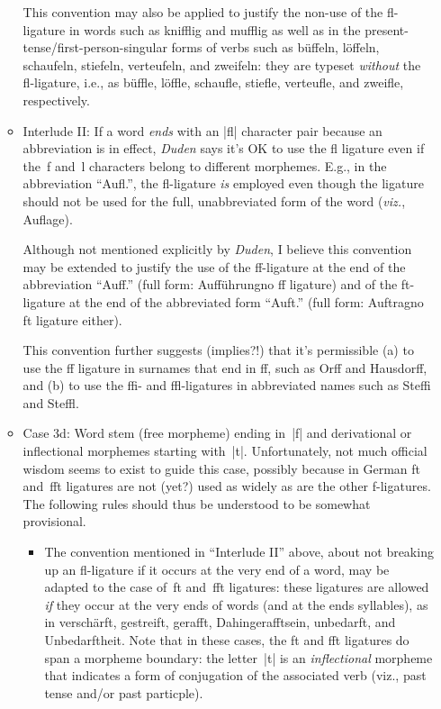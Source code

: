 \documentclass[11pt]{article}
\begin{document}
\begin{itemize}
\begin{itemize}
This convention may also be applied to justify the non-use of the fl-ligature in words such as knifflig and mufflig as well as in the present-tense/first-person-singular forms of verbs such as büffeln, löffeln, schaufeln, stiefeln, verteufeln, and zweifeln: they are typeset \emph{without} the fl-ligature, i.e., as büffle, löffle, schaufle, stiefle, verteufle, and zweifle, respectively.

\item Interlude II: If a word \emph{ends} with an |fl| character pair because an abbreviation is in effect, \emph{Duden} says it's OK to use the fl ligature even if the~f and~l characters belong to different morphemes. E.g., in the abbreviation \enquote{Aufl.}, the fl-ligature \emph{is} employed even though the ligature should not be used for the full, unabbreviated form of the word (\emph{viz.}, Auflage).

Although not mentioned explicitly by \emph{Duden}, I believe this convention may be extended to justify the use of the ff-ligature at the end of the abbreviation \enquote{Auff.} (full form: Aufführung\textemdash no ff ligature) and of the ft-ligature at the end of the abbreviated form \enquote{Auft.} (full form: Auftrag\textemdash no ft ligature either).

This convention further suggests (implies?!) that it's permissible (a) to use the ff ligature in surnames that end in ff, such as Orff and Hausdorff, and (b) to use the ffi- and ffl-ligatures in abbreviated names such as Steffi and Steffl. 

\item Case 3d: Word stem (free morpheme) ending in~|f| and derivational or inflectional morphemes starting with~|t|. Unfortunately, not much official wisdom seems to exist to guide this case, possibly because in German ft and~fft ligatures are not (yet?) used as widely as are the other f-ligatures. The following rules should thus be understood to be somewhat provisional.

\begin{itemize}
\item The convention mentioned in \enquote{Interlude II} above, about not breaking up an fl-ligature if it occurs at the very end of a word, may be adapted to the case of~ft and~fft ligatures: these ligatures are allowed \emph{if} they occur at the very ends of words (and at the ends syllables), as in verschärft, gestreift, gerafft, Dahingerafftsein, unbedarft, and Unbedarftheit. Note that in these cases, the ft and fft ligatures do span a morpheme boundary: the letter~|t| is an \emph{inflectional} morpheme that indicates a form of conjugation of the associated verb (viz., past tense and/or past particple).


\end{itemize}
\end{itemize}
\end{itemize}
\end{document}
